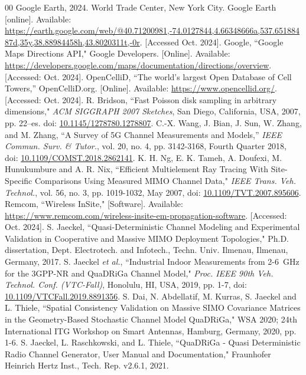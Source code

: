 \documentclass{IEEEtran}
\newcommand*{\doi}[1]{\href{http://dx.doi.org/#1}{#1}}
\begin{document}
\begin{thebibliography}{00}
 Google Earth, 2024. World Trade Center, New York City. Google Earth [online]. Available: \url{https://earth.google.com/web/@40.71200981,-74.0127844,4.66348666a,537.65188487d,35y,38.88984458h,43.8020311t,-0r}. [Accessed Oct. 2024].
Google, ``Google Maps Directions API," Google Developers. [Online]. Available: \url{https://developers.google.com/maps/documentation/directions/overview}. [Accessed: Oct. 2024].
 OpenCelliD, ``The world's largest Open Database of Cell Towers,'' OpenCelliD.org. [Online]. Available: \url{https://www.opencellid.org/}. [Accessed: Oct. 2024].
 R. Bridson, ``Fast Poisson disk sampling in arbitrary dimensions," \textit{ACM SIGGRAPH 2007 Sketches}, San Diego, California, USA, 2007, pp. 22–es. doi: \doi{10.1145/1278780.1278807}.
 C.-X. Wang, J. Bian, J. Sun, W. Zhang, and M. Zhang, ``A Survey of 5G Channel Measurements and Models,'' \textit{IEEE Commun. Surv. \& Tutor.}, vol. 20, no. 4, pp. 3142-3168, Fourth Quarter 2018, doi: \doi{10.1109/COMST.2018.2862141}.
 K. H. Ng, E. K. Tameh, A. Doufexi, M. Hunukumbure and A. R. Nix, ``Efficient Multielement Ray Tracing With Site-Specific Comparisons Using Measured MIMO Channel Data," \textit{IEEE Trans. Veh. Technol.}, vol. 56, no. 3, pp. 1019-1032, May 2007, doi: \doi{10.1109/TVT.2007.895606}.
 Remcom, ``Wireless InSite," [Software]. Available: \url{https://www.remcom.com/wireless-insite-em-propagation-software}. [Accessed: Oct. 2024].
 S. Jaeckel, ``Quasi-Deterministic Channel Modeling and Experimental Validation in Cooperative and Massive MIMO Deployment Topologies," Ph.D. dissertation, Dept. Electrotech. and Infotech., Techn. Univ. Ilmenau, Ilmenau, Germany, 2017.
 S. Jaeckel \textit{et al.}, ``Industrial Indoor Measurements from 2-6~GHz for the 3GPP-NR and QuaDRiGa Channel Model," \textit{Proc. IEEE 90th Veh. Technol. Conf. (VTC-Fall)}, Honolulu, HI, USA, 2019, pp. 1-7, doi: \doi{10.1109/VTCFall.2019.8891356}.
 S. Dai, N. Abdellatif, M. Kurras, S. Jaeckel and L. Thiele, ``Spatial Consistency Validation on Massive SIMO Covariance Matrices in the Geometry-Based Stochastic Channel Model QuaDRiGa," WSA 2020; 24th International ITG Workshop on Smart Antennas, Hamburg, Germany, 2020, pp. 1-6.
 S. Jaeckel, L. Raschkowski, and L. Thiele, ``QuaDRiGa - Quasi Deterministic Radio Channel Generator, User Manual and Documentation," Fraunhofer Heinrich Hertz Inst., Tech. Rep. v2.6.1, 2021.

\end{thebibliography}
\end{document}

